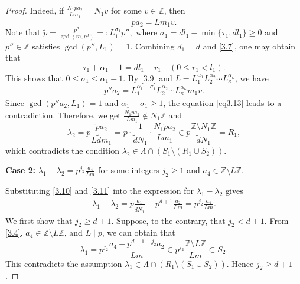 \documentclass[11pt]{article}
\numberwithin{equation}{section}
\begin{document}
\begin{proof}
Indeed, if  $\frac{N_1 \tilde{p} a_2}{L m_1}=N_1 v$  for some  $v \in \mathbb{Z}$, then
\begin{equation}\label{3.9}
\tilde{p} a_2 = L m_1 v.
\end{equation}
Note that
$\tilde{p}=\frac{p^d}{\gcd(m,p^d)}=:L_1^{\sigma_1}p'',$
where $\sigma_1=dl_1-\min\{\tau_1, dl_1\}\geq 0$  and $p''\in\mathbb{Z}$ satisfies $\gcd(p'',L_1)=1$. Combining $d_1=d$ and \eqref{3.7}, one may obtain that
$$\tau_1 + \alpha_1 - 1 = d l_1 + r_1 \quad (0 \leq r_1 < l_1).$$
This shows that $0\leq\sigma_1\leq \alpha_1-1$. By \eqref{3.9} and $L = L_1^{\alpha_1} L_2^{\alpha_2} \cdots L_\kappa^{\alpha_\kappa}$, we have
\begin{align}\label{eq3.13}
	p''a_2=L_1^{\alpha_1-\sigma_1}L_2^{\alpha_2} \cdots L_\kappa^{\alpha_\kappa}m_1v.
\end{align}
Since  $\gcd(p'' a_2, L_1)=1$ and $\alpha_1-\sigma_1\geq 1$, the equation \eqref{eq3.13} leads to a contradiction.
 Therefore, we get $\frac{N_1 \tilde{p} a_2}{L m_1} \notin N_1 \mathbb{Z}$ and 
$$
\lambda_2 = p \frac{\tilde{p} a_2}{L \tilde{d} m_1} = p \cdot \frac{1}{\tilde{d} N_1} \cdot \frac{N_1 \tilde{p} a_2}{L m_1} \in p \frac{\mathbb{Z} \setminus N_1 \mathbb{Z}}{\tilde{d} N_1} = R_1,
$$
which contradicts the condition $\lambda_2 \in \Lambda \cap \left( S_1 \setminus (R_1 \cup S_2) \right)$.

\textbf{Case 2:} $\lambda_1-\lambda_2 = p^{j_2} \frac{a_4}{Lm}$ for some integers $j_2\geq 1$ and $a_4 \in \mathbb{Z} \setminus L\mathbb{Z}$.

Substituting \eqref{3.10} and \eqref{3.11} into the expression for $\lambda_1-\lambda_2$ gives
\begin{align}\label{3.4}
\lambda_1-\lambda_2 =p \frac{a_1}{\tilde{d} N_1}- p^{d+1} \frac{a_2}{L m}=p^{j_2} \frac{a_4}{Lm}.
\end{align}
We first show that  $j_2 \geq d + 1$. Suppose, to the contrary, that  $j_2 < d + 1$.
From \eqref{3.4}, $a_4\in\mathbb{Z} \setminus L \mathbb{Z}$, and $L \mid p$, we can obtain that
$$\lambda_1=p^{j_2} \frac{a_4+p^{d + 1 - j_2} a_2}{L m}\in p^{j_2}\frac{\mathbb{Z}\setminus L\mathbb{Z}}{Lm}\subset S_2.$$
This contradicts the assumption $\lambda_1\in\Lambda\cap\left( R_1\setminus(S_1\cup S_2)\right)$. Hence  $j_2 \geq d+1$.


\end{proof}
\end{document}
